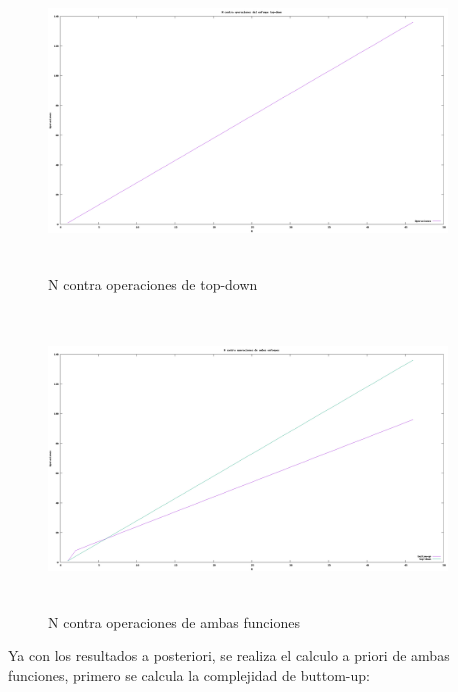 \documentclass[spanish]{article}
\begin{document}
	\begin{figure}[H]
		\centering
		\includegraphics[width=400px,height=300px]{grafica2}
		\caption{N contra operaciones de top-down}
	\end{figure}
	\begin{figure}[H]
		\centering
		\includegraphics[width=400px,height=300px]{grafica3}
		\caption{N contra operaciones de ambas funciones}
	\end{figure}
	Ya con los resultados a posteriori, se realiza el calculo a priori de ambas funciones, primero se calcula la complejidad de buttom-up:\\
\end{document}
